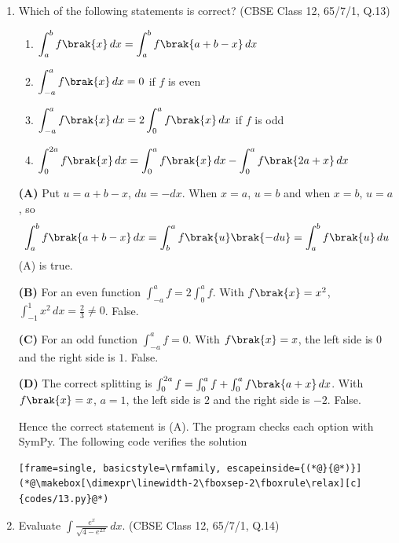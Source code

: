 \begin{enumerate}[label=\thesubsection.\arabic*, ref=\thesubsection.\theenumi]
\item
Which of the following statements is correct?
\hfill (CBSE Class 12, 65/7/1, Q.13)
\begin{enumerate}[label=(\Alph*)]
	\item $\displaystyle\int_a^b f\brak{x}\,dx = \int_a^b f\brak{a+b-x}\,dx$
	\item $\displaystyle\int_{-a}^{a} f\brak{x}\,dx = 0$ if $f$ is even
	\item $\displaystyle\int_{-a}^{a} f\brak{x}\,dx = 2\int_0^a f\brak{x}\,dx$ if $f$ is odd
	\item $\displaystyle\int_0^{2a} f\brak{x}\,dx = \int_0^a f\brak{x}\,dx - \int_0^a f\brak{2a+x}\,dx$
\end{enumerate}

\solution
\textbf{(A)} Put $u = a+b-x$, $du = -dx$. When $x = a$, $u = b$ and when $x = b$, $u = a$, so
\begin{align}
	\int_a^b f\brak{a+b-x}\,dx = \int_b^a f\brak{u}\brak{-du} = \int_a^b f\brak{u}\,du
\end{align}
(A) is true.

\textbf{(B)} For an even function $\int_{-a}^{a} f = 2\int_0^a f$. With $f\brak{x} = x^2$, $\int_{-1}^{1}x^2\,dx = \frac{2}{3} \neq 0$. False.

\textbf{(C)} For an odd function $\int_{-a}^{a} f = 0$. With $f\brak{x} = x$, the left side is $0$ and the right side is $1$. False.

\textbf{(D)} The correct splitting is $\int_0^{2a} f = \int_0^a f + \int_0^a f\brak{a+x}\,dx$. With $f\brak{x}=x$, $a=1$, the left side is $2$ and the right side is $-2$. False.

Hence the correct statement is (A). The program checks each option with SymPy. The following code verifies the solution
\begin{lstlisting}[frame=single, basicstyle=\rmfamily, escapeinside={(*@}{@*)}]
(*@\makebox[\dimexpr\linewidth-2\fboxsep-2\fboxrule\relax][c]{codes/13.py}@*)
\end{lstlisting}

\item
Evaluate $\displaystyle\int \frac{e^x}{\sqrt{4 - e^{2x}}}\,dx$.
\hfill (CBSE Class 12, 65/7/1, Q.14)


\end{enumerate}
